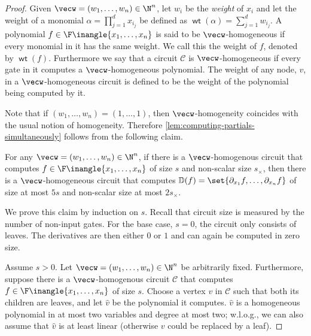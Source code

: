 \documentclass[11pt]{article}
\newcommand{\ckt}{\textbf{$\mathcal{C}$}}
\newcommand{\wt}{\operatorname{\mathsf{wt}}}
\begin{document}
\begin{proof}
  Given $\vecw = (w_1, \ldots, w_n) \in \N^n$, let $w_i$ be the \emph{weight} of $x_i$ and let the weight of a monomial $\alpha= \prod_{j=1}^{d} x_{i_j}$ be defined as $\wt(\alpha) = \sum_{j=1}^{d} w_{i_j}$.
  A polynomial $f \in \F\inangle{x_1, \ldots, x_n}$ is said to be $\vecw$-homogeneous if every monomial in it has the same weight.  We call this the weight of $f$, denoted by $\wt(f)$.
  Furthermore we say that a circuit $\ckt$ is $\vecw$-homogeneous if every gate in it computes a $\vecw$-homogeneous polynomial.
  The weight of any node, $v$, in a $\vecw$-homogeneous circuit is defined to be the weight of the polynomial being computed by it.

  Note that if $(w_1, \ldots, w_n) = (1, \ldots, 1)$, then  $\vecw$-homogeneity coincides with the usual notion of homogeneity. %
  Therefore \autoref{lem:computing-partials-simultaneously} follows from the following claim.
  
  \begin{claim}
    For any $\vecw = (w_1, \ldots, w_n) \in \N^n$, if there is a $\vecw$-homogenous circuit that computes $f \in \F\inangle{x_1, \ldots, x_n}$ of size $s$ and non-scalar size $s_\times$, then there is a $\vecw$-homogeneous  circuit that computes $\mathbb{D}(f) = \set{\partial_{ x_1}f, \ldots, \partial_{ x_n}f}$ of size at most $5s$ and non-scalar size at most $2s_\times$.
  \end{claim}

  We prove this claim by induction on $s$. Recall that circuit size is measured by the number of non-input gates. 
  For the base case, $s=0$, the circuit only consists of leaves. The derivatives are then either $0$ or $1$ and can again be computed in zero size.  
  
  Assume $s > 0$.
  Let $\vecw = (w_1, \ldots, w_n) \in \N^n$ be arbitrarily fixed.
  Furthermore, suppose there is a $\vecw$-homogenous  circuit $\ckt$ that computes $f \in \F\inangle{x_1, \ldots, x_n}$ of size $s$.
  Choose a vertex $v$ in $\ckt$ such that both its children are leaves, and let $\widehat {v}$ be the polynomial it computes.  
  $\widehat {v}$ is a homogeneous polynomial in at most two variables and degree at most two;  w.l.o.g., we can also assume that $\widehat {v}$ is at least linear (otherwise $v$ could be replaced by a leaf).  
  

\end{proof}
\end{document}
